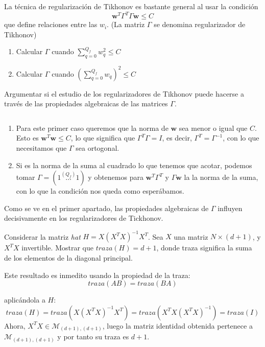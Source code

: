 \documentclass[11pt,leqno]{article}
\theoremstyle{definition}
\begin{document}
\begin{cuestion}
La técnica de regularización de Tikhonov es bastante general al usar la condición
\[ \mathbf{w}^T \Gamma^T \Gamma \mathbf{w} \leq C	\]
que define relaciones entre las $w_i$. (La matriz $\Gamma$ se denomina regularizador de Tikhonov)
\begin{enumerate}[a]
\item Calcular $\Gamma$ cuando $\sum\limits_{q=0}^{Q_f} w_q^2 \leq C$
\item Calcular $\Gamma$ cuando $\left(\sum\limits_{q=0}^{Q_f} w_q\right)^2 \leq C$
\end{enumerate}

Argumentar si el estudio de los regularizadores de Tikhonov puede hacerse a través de las propiedades algebraicas de las matrices $\Gamma$.

\end{cuestion}

\begin{solucion} $\ $
\begin{enumerate}[a]
\item Para este primer caso queremos que la norma de $\mathbf{w}$ sea menor o igual que $C$. Esto es $\mathbf{w}^T\mathbf{w} \leq C$, lo que significa que $\Gamma^T \Gamma = I$, es decir, $\Gamma^T = \Gamma^{-1}$, con lo que necesitamos que $\Gamma$ sea ortogonal.
\item Si es la norma de la suma al cuadrado lo que tenemos que acotar, podemos tomar $\Gamma = (1 \overset{(Q_f)}{\dots} 1)$ y obtenemos para  $\mathbf{w}^T \Gamma^T$ y  $\Gamma\mathbf{w}$ la la norma de la suma, con lo que la condición nos queda como esperábamos. 
\end{enumerate}
 
	Como se ve en el primer apartado, las propiedades algebraicas de $\Gamma$ influyen decisivamente en los regularizadores de Tickhonov. 
	
\end{solucion}


\begin{cuestionopcional}
Considerar la matriz \textit{hat} $H = X(X^T X)^{-1}X^T$. Sea $X$ una matriz $N \times (d + 1)$, y $X^T X$
invertible. Mostrar que $traza(H) = d + 1$, donde traza significa la suma de los elementos de la diagonal principal. 
\end{cuestionopcional}

\begin{solucionopcional}
Este resultado es inmedito usando la propiedad de la traza:
	\[ traza(AB) = traza(BA)	\]

aplicándola a $H$:
	\[ traza(H) = traza(X(X^T X)^{-1}X^T) = traza( X^T X (X^T X)^{-1}) = traza(I)	\]
Ahora, $X^T X \in \mathcal{M}_{(d+1),(d+1)}$, luego la matriz identidad obtenida pertenece a $\mathcal{M}_{(d+1),(d+1)}$ y por tanto su traza es $d+1$.
\end{solucionopcional}
\end{document}
